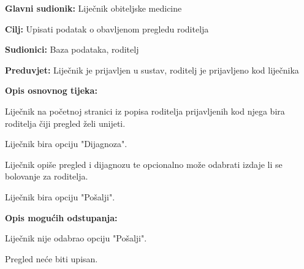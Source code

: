 					\noindent {}
					\begin{packed_item}
						
						\item \textbf{Glavni sudionik: }Liječnik obiteljske medicine
						\item  \textbf{Cilj:} Upisati podatak o obavljenom pregledu roditelja
						\item  \textbf{Sudionici:} Baza podataka, roditelj
						\item  \textbf{Preduvjet:} Liječnik je prijavljen u sustav, roditelj je prijavljeno kod liječnika
						\item  \textbf{Opis osnovnog tijeka:}
						
						\item[] \begin{packed_enum}
							
							\item Liječnik na početnoj stranici iz popisa roditelja prijavljenih kod njega bira roditelja čiji pregled želi unijeti.
							\item Liječnik bira opciju "Dijagnoza".
							\item Liječnik opiše pregled i dijagnozu te opcionalno može odabrati izdaje li se bolovanje za roditelja.
							\item Liječnik bira opciju "Pošalji".
						\end{packed_enum}
						
						\item  \textbf{Opis mogućih odstupanja:}
						
						\item[] \begin{packed_item}
							
							\item[4.a] Liječnik nije odabrao opciju "Pošalji".
							\item[] \begin{packed_enum}
								
								\item Pregled neće biti upisan.
							\end{packed_enum}
							
							
						\end{packed_item}
						
						
					\end{packed_item}
					
					
					
